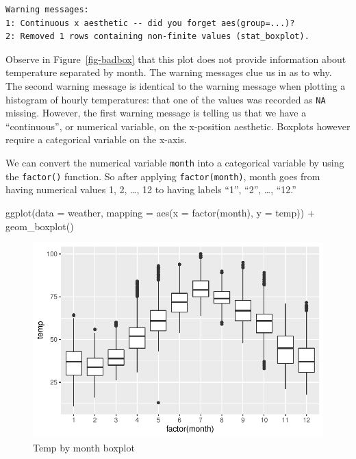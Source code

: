 \documentclass[
  letterpaper,
  DIV=11,
  numbers=noendperiod]{scrreprt}
\newenvironment{Shaded}{\begin{snugshade}}{\end{snugshade}}
\newcommand{\AttributeTok}[1]{\textcolor[rgb]{0.40,0.45,0.13}{#1}}
\newcommand{\FunctionTok}[1]{\textcolor[rgb]{0.28,0.35,0.67}{#1}}
\newcommand{\NormalTok}[1]{\textcolor[rgb]{0.00,0.23,0.31}{#1}}
\newcommand{\SpecialCharTok}[1]{\textcolor[rgb]{0.37,0.37,0.37}{#1}}
\theoremstyle{definition}
\theoremstyle{remark}
\begin{document}
\begin{verbatim}
Warning messages:
1: Continuous x aesthetic -- did you forget aes(group=...)? 
2: Removed 1 rows containing non-finite values (stat_boxplot). 
\end{verbatim}

Observe in Figure~\ref{fig-badbox} that this plot does not provide
information about temperature separated by month. The warning messages
clue us in as to why. The second warning message is identical to the
warning message when plotting a histogram of hourly temperatures: that
one of the values was recorded as \texttt{NA} missing. However, the
first warning message is telling us that we have a ``continuous'', or
numerical variable, on the x-position aesthetic. Boxplots however
require a categorical variable on the x-axis.

We can convert the numerical variable \texttt{month} into a categorical
variable by using the \texttt{factor()} function. So after applying
\texttt{factor(month)}, month goes from having numerical values 1, 2,
\ldots, 12 to having labels ``1'', ``2'', \ldots, ``12.''

\begin{Shaded}
\begin{Highlighting}[]
\FunctionTok{ggplot}\NormalTok{(}\AttributeTok{data =}\NormalTok{ weather, }\AttributeTok{mapping =} \FunctionTok{aes}\NormalTok{(}\AttributeTok{x =} \FunctionTok{factor}\NormalTok{(month), }\AttributeTok{y =}\NormalTok{ temp)) }\SpecialCharTok{+}
  \FunctionTok{geom\_boxplot}\NormalTok{()}
\end{Highlighting}
\end{Shaded}

\begin{figure}[H]

{\centering \includegraphics{02-visualization_files/figure-pdf/fig-monthtempbox-1.pdf}

}

\caption{\label{fig-monthtempbox}Temp by month boxplot}

\end{figure}
\end{document}
